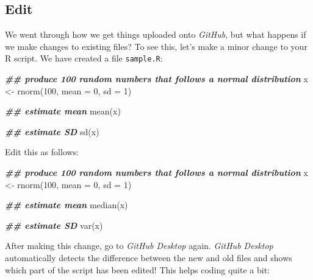 \documentclass[
]{book}
\newenvironment{Shaded}{\begin{snugshade}}{\end{snugshade}}
\newcommand{\AttributeTok}[1]{\textcolor[rgb]{0.77,0.63,0.00}{#1}}
\newcommand{\DecValTok}[1]{\textcolor[rgb]{0.00,0.00,0.81}{#1}}
\newcommand{\DocumentationTok}[1]{\textcolor[rgb]{0.56,0.35,0.01}{\textbf{\textit{#1}}}}
\newcommand{\FunctionTok}[1]{\textcolor[rgb]{0.00,0.00,0.00}{#1}}
\newcommand{\NormalTok}[1]{#1}
\newcommand{\OtherTok}[1]{\textcolor[rgb]{0.56,0.35,0.01}{#1}}
\begin{document}
\hypertarget{edit}{%
\subsection{Edit}\label{edit}}

We went through how we get things uploaded onto \emph{GitHub}, but what happens if we make changes to existing files? To see this, let's make a minor change to your R script. We have created a file \texttt{sample.R}:

\begin{Shaded}
\begin{Highlighting}[]
\DocumentationTok{\#\# produce 100 random numbers that follows a normal distribution}
\NormalTok{x }\OtherTok{\textless{}{-}} \FunctionTok{rnorm}\NormalTok{(}\DecValTok{100}\NormalTok{, }\AttributeTok{mean =} \DecValTok{0}\NormalTok{, }\AttributeTok{sd =} \DecValTok{1}\NormalTok{)}

\DocumentationTok{\#\# estimate mean}
\FunctionTok{mean}\NormalTok{(x)}

\DocumentationTok{\#\# estimate SD}
\FunctionTok{sd}\NormalTok{(x)}
\end{Highlighting}
\end{Shaded}

Edit this as follows:

\begin{Shaded}
\begin{Highlighting}[]
\DocumentationTok{\#\# produce 100 random numbers that follows a normal distribution}
\NormalTok{x }\OtherTok{\textless{}{-}} \FunctionTok{rnorm}\NormalTok{(}\DecValTok{100}\NormalTok{, }\AttributeTok{mean =} \DecValTok{0}\NormalTok{, }\AttributeTok{sd =} \DecValTok{1}\NormalTok{)}

\DocumentationTok{\#\# estimate mean}
\FunctionTok{median}\NormalTok{(x)}

\DocumentationTok{\#\# estimate SD}
\FunctionTok{var}\NormalTok{(x)}
\end{Highlighting}
\end{Shaded}

After making this change, go to \emph{GitHub Desktop} again. \emph{GitHub Desktop} automatically detects the difference between the new and old files and shows which part of the script has been edited! This helps coding quite a bit:
\end{document}
